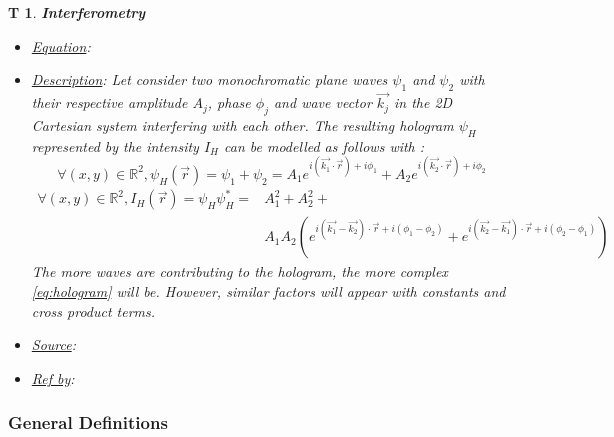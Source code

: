 \documentclass[12pt]{article}
\newtheorem{T}{T}
\begin{document}
\begin{T}
\normalfont \textbf{Interferometry}
\begin{itemize}
\item \underline{Equation}: 
\item \underline{Description}: Let consider two monochromatic plane waves $\psi_1$ and $\psi_2$ with their respective amplitude $A_j$, phase $\phi_j$ and wave vector $\vec{k_j}$ in the 2D Cartesian system interfering with each other. The resulting hologram $\psi_H$ represented by the intensity $I_H$ can be modelled as follows with :
\begin{equation}
\forall (x,y) \in \mathbb{R}^{2}, \psi_H(\vec{r})=\psi_1+\psi_2= A_1e^{i(\vec{k_1}\cdot\vec{r})+i\phi_1}+A_2e^{i(\vec{k_2}\cdot\vec{r})+i\phi_2}
\end{equation}
\begin{equation}
\begin{split}
\forall (x,y) \in \mathbb{R}^{2}, I_H(\vec{r})=\psi_H\psi_H^{*}= & A_{1}^{2}+A_{2}^{2}+ \\ & A_{1}A_{2}(e^{i(\vec{k_1}-\vec{k_2})\cdot\vec{r}+i(\phi_1-\phi_2)}+e^{i(\vec{k_2}-\vec{k_1})\cdot\vec{r}+i(\phi_2-\phi_1)})
\end{split}
\label{eq:hologram}
\end{equation}
The more waves are contributing to the hologram, the more complex \cref{eq:hologram} will be. However, similar factors will appear with constants and cross product terms.
\item \underline{Source}:
\item \underline{Ref by}:
\end{itemize}
\label{T_4}
\end{T}

\subsubsection{General Definitions}\label{sec_gendef}
\end{document}
